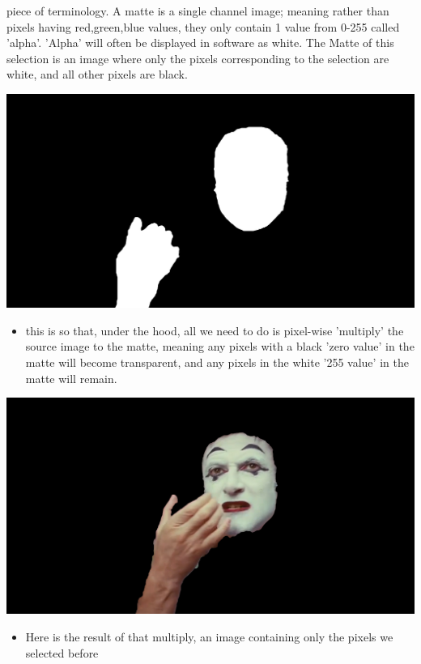 \documentclass[15pt]{article}
\begin{document}
\begin{itemize}
piece of terminology. A matte is a single channel image; meaning rather than
pixels having red,green,blue values, they only contain 1 value from 0-255
called 'alpha'. 'Alpha' will often be displayed in software as white. The
Matte of this selection is an image where only the pixels corresponding to the
selection are white, and all other pixels are black.
\begin{center}
\includegraphics[width=.9\linewidth]{./roto/matte.PNG}
\end{center}
\begin{itemize}
\item this is so that, under the hood, all we need to do is pixel-wise 'multiply' the
source image to the matte, meaning any pixels with a black 'zero value' in
the matte will become transparent, and any pixels in the white '255 value'
in the matte will remain.
\end{itemize}
\begin{center}
\includegraphics[width=.9\linewidth]{./roto/goals.PNG}
\end{center}
\begin{itemize}
\item Here is the result of that multiply, an image containing only the pixels we
selected before
\end{itemize}
\end{itemize}
\end{document}
